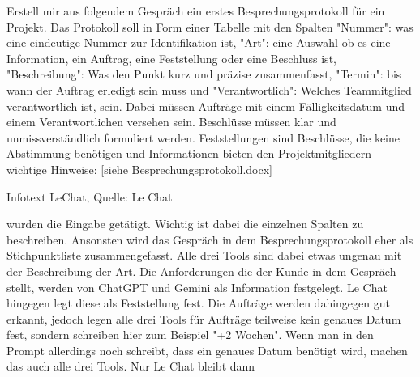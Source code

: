         \begin{prompt}[H]
            \begin{tcolorbox}[colback=gray!20, colframe=gray!20, boxrule=0pt, sharp corners] 
                Erstell mir aus folgendem Gespräch ein erstes Besprechungsprotokoll für ein Projekt. Das Protokoll soll in 
                Form einer Tabelle mit den Spalten "Nummer": was eine eindeutige Nummer zur Identifikation ist, "Art": eine 
                Auswahl ob es eine Information, ein Auftrag, eine Feststellung oder eine Beschluss ist, "Beschreibung": Was 
                den Punkt kurz und präzise zusammenfasst, "Termin": bis wann der Auftrag erledigt sein muss und 
                "Verantwortlich": Welches Teammitglied verantwortlich ist, sein. Dabei müssen Aufträge mit einem 
                Fälligkeitsdatum und einem Verantwortlichen versehen sein. Beschlüsse müssen klar und unmissverständlich 
                formuliert werden. Feststellungen sind Beschlüsse, die keine Abstimmung benötigen und Informationen bieten 
                den Projektmitgliedern wichtige Hinweise: [siehe Besprechungsprotokoll.docx]
                \vfill
            \end{tcolorbox}
            \caption{Infotext LeChat, Quelle: Le Chat}
            \label{InfotextLeChat}
        \end{prompt}
    
        wurden die Eingabe getätigt. Wichtig ist dabei die einzelnen Spalten zu beschreiben. Ansonsten wird das Gespräch in dem 
        Besprechungsprotokoll eher als Stichpunktliste zusammengefasst. Alle drei Tools sind dabei etwas ungenau mit der 
        Beschreibung der Art. Die Anforderungen die der Kunde in dem Gespräch stellt, werden von ChatGPT und Gemini als 
        Information festgelegt. Le Chat hingegen legt diese als Feststellung fest. Die Aufträge werden dahingegen gut 
        erkannt, jedoch legen alle drei Tools für Aufträge teilweise kein genaues Datum fest, sondern schreiben hier zum 
        Beispiel "+2 Wochen". Wenn man in den Prompt allerdings noch schreibt, dass ein genaues Datum benötigt wird, machen 
        das auch alle drei Tools. Nur Le Chat bleibt dann 